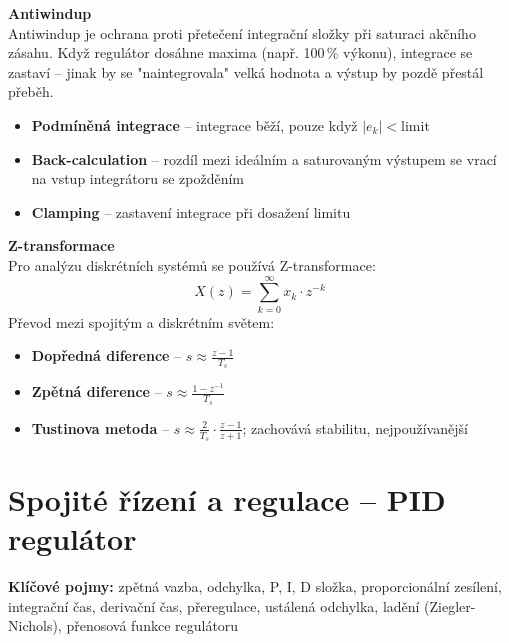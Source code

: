 \documentclass[a4paper,10pt]{article}
\begin{document}
\begin{vysvetlenibox}
\textbf{Antiwindup}\\
Antiwindup je ochrana proti přetečení integrační složky při saturaci
akčního zásahu. Když regulátor dosáhne maxima (např. 100\,\% výkonu),
integrace se zastaví -- jinak by se "naintegrovala" velká hodnota
a výstup by pozdě přestál přeběh.

\begin{itemize}[noitemsep, leftmargin=1.4em, topsep=4pt]
    \item \textbf{Podmíněná integrace} -- integrace běží, pouze když $|e_k| < \text{limit}$
    \item \textbf{Back-calculation} -- rozdíl mezi ideálním a saturovaným výstupem
          se vrací na vstup integrátoru se zpožděním
    \item \textbf{Clamping} -- zastavení integrace při dosažení limitu
\end{itemize}

\textbf{Z-transformace}\\
Pro analýzu diskrétních systémů se používá Z-transformace:
$$X(z) = \sum_{k=0}^{\infty} x_k \cdot z^{-k}$$
Převod mezi spojitým a diskrétním světem:
\begin{itemize}[noitemsep, leftmargin=1.4em, topsep=4pt]
    \item \textbf{Dopředná diference} -- $s \approx \frac{z-1}{T_s}$
    \item \textbf{Zpětná diference} -- $s \approx \frac{1-z^{-1}}{T_s}$
    \item \textbf{Tustinova metoda} -- $s \approx \frac{2}{T_s} \cdot \frac{z-1}{z+1}$;
          zachovává stabilitu, nejpoužívanější
\end{itemize}
\end{vysvetlenibox}



\newpage

\section{Spojité řízení a regulace -- PID regulátor}

\begin{pojmybox}
\textbf{Klíčové pojmy:}
zpětná vazba, odchylka, P, I, D složka, proporcionální zesílení,
integrační čas, derivační čas, přeregulace, ustálená odchylka,
ladění (Ziegler-Nichols), přenosová funkce regulátoru
\end{pojmybox}
\end{document}
